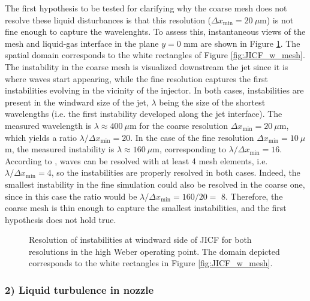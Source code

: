 The first hypothesis to be tested for clarifying why the coarse mesh does not resolve these liquid disturbances is that this resolution ($\Delta x_\mathrm{min} = 20~\mu$m) is not fine enough to capture the wavelenghts. To assess this, instantaneous views of the mesh and liquid-gas interface in the plane $y = 0$ mm are shown in Figure \ref{fig:JICF_instabilities_lambda}. The spatial domain corresponds to the white rectangles of Figure \ref{fig:JICF_w_mesh}. The instability in the coarse mesh is visualized downstream the jet since it is where waves start appearing, while the fine resolution captures the first instabilities evolving in the vicinity of the injector. In both cases, instabilities are present in the windward size of the jet, $\lambda$ being the size of the shortest wavelengths (i.e. the first instability developed along the jet interface). The measured wavelength is $\lambda \approx 400 ~ \mu$m for the coarse resolution $\Delta x_\mathrm{min} = 20~\mu$m, which yields a ratio $\lambda / \Delta x_\mathrm{min} = 20$. In the case of the fine resolution $\Delta x_\mathrm{min} = 10~\mu$m, the measured instability is $\lambda \approx 160 ~ \mu$m, corresponding to $\lambda / \Delta x_\mathrm{min} = 16$.  According to , waves can be resolved with at least 4 mesh elements, i.e.  $\lambda / \Delta x_\mathrm{min} = 4$, so the instabilities are properly resolved in both cases. Indeed, the smallest instability in the fine simulation could also be resolved in the coarse one, since in this case the ratio would be $\lambda / \Delta x_\mathrm{min} = 160/20 = $ 8. Therefore, the coarse mesh is thin enough to capture the smallest instabilities, and the first hypothesis does not hold true.

\clearpage

\begin{figure}[ht]
\centering
{}
\caption[Resolution of instabilities at windward side of JICF for both resolutions in the high Weber operating point.]{Resolution of instabilities at windward side of JICF for both resolutions in the high Weber operating point. The domain depicted corresponds to the white rectangles in Figure \ref{fig:JICF_w_mesh}. }
\label{fig:JICF_instabilities_lambda}
\end{figure}

\subsubsection*{2) Liquid turbulence in nozzle}

